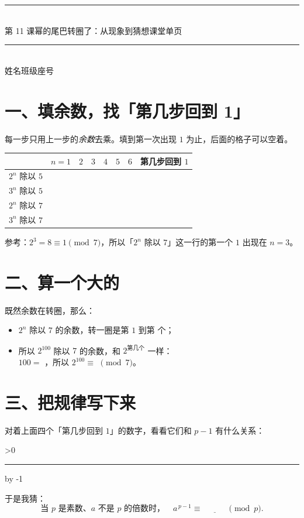 \documentclass[11pt]{ctexart}
\newenvironment{dongshou}[1][]{\par\vspace{3pt}}{\par\vspace{3pt}}
\newcommand{\liukong}[1]{%
  \par\vspace{4pt}%
  \noindent\begin{minipage}{\linewidth}%
    \setlength{\parindent}{0pt}\setlength{\parskip}{0pt}%
    \xhcnt=#1\relax
    \loop\ifnum\xhcnt>0
      \noindent\textcolor{black!35}{\rule{\linewidth}{0.5pt}}\par\vspace{0.8cm}%
      \advance\xhcnt by -1\relax
    \repeat
    \vspace{-0.8cm}%
  \end{minipage}%
  \par\vspace{3pt}%
}
\newcommand{\biaoti}[2]{%
  {\color{pagegreen}\rule{\textwidth}{1.2pt}}\\[6pt]
  {\heiti\Large 第 #1 课\quad #2}\hfill{\small\songti 课堂单页}\\[6pt]
  {\color{pagegreen}\rule{\textwidth}{0.5pt}}\\[4pt]
  {\small 姓名\underline{\hspace{3.2cm}}\qquad 班级\underline{\hspace{2.4cm}}\qquad 座号\underline{\hspace{1.6cm}}}
  \vspace{0.4em}
}
\begin{document}
\biaoti{11}{幂的尾巴转圈了：从现象到猜想}

\section*{一、填余数，找「第几步回到 1」}

\noindent 每一步只用上一步的\emph{余数}去乘。填到第一次出现 \(1\) 为止，后面的格子可以空着。

\begin{center}
{\small
\begin{tabular}{@{}l|cccccc|c@{}}
  \toprule
   & \(n=1\) & \(2\) & \(3\) & \(4\) & \(5\) & \(6\) & 第几步回到 \(1\) \\
  \midrule
  \rule{0pt}{3.2ex}\(2^n\) 除以 \(5\) & & & & & & & \\
  \rule{0pt}{3.2ex}\(3^n\) 除以 \(5\) & & & & & & & \\
  \rule{0pt}{3.2ex}\(2^n\) 除以 \(7\) & & & & & & & \\
  \rule{0pt}{3.2ex}\(3^n\) 除以 \(7\) & & & & & & & \\
  \bottomrule
\end{tabular}}
\end{center}

\vspace{0.3em}
\noindent 参考：\(2^3=8\equiv1\pmod 7\)，所以「\(2^n\) 除以 \(7\)」这一行的第一个 \(1\) 出现在 \(n=3\)。

\section*{二、算一个大的}

\begin{dongshou}
  既然余数在转圈，那么：
  \begin{itemize}
    \item \(2^n\) 除以 \(7\) 的余数，转一圈是第 \(1\) 到第 \underline{\hspace{1.4em}} 个；
    \item 所以 \(2^{100}\) 除以 \(7\) 的余数，和 \(2^{\text{第几个}}\) 一样：\\
      \(100=\) \underline{\hspace{2.4em}}，所以 \(2^{100}\equiv\) \underline{\hspace{2.4em}} \(\pmod 7\)。
  \end{itemize}
\end{dongshou}

\section*{三、把规律写下来}

\begin{dongshou}
  对着上面四个「第几步回到 \(1\)」的数字，看看它们和 \(p-1\) 有什么关系：
  \liukong{2}
  于是我猜：
  \[
    \text{当 }p\text{ 是素数、}a\text{ 不是 }p\text{ 的倍数时，}\quad a^{\,p-1}\equiv\underline{\hspace{3em}} \pmod p .
  \]
\end{dongshou}
\end{document}
